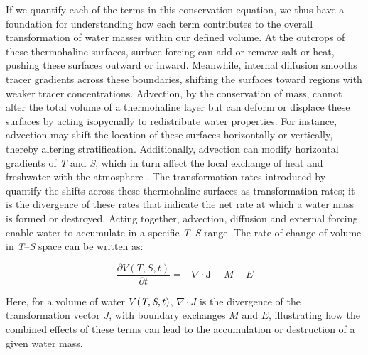\documentclass[draft]{agujournal2019}
\begin{document}
If we quantify each of the terms in this conservation equation, we thus have a foundation for understanding how each term contributes to the overall transformation of water masses within our defined volume. At the outcrops of these thermohaline surfaces, surface forcing can add or remove salt or heat, pushing these surfaces outward or inward. Meanwhile, internal diffusion smooths tracer gradients across these boundaries, shifting the surfaces toward regions with weaker tracer concentrations. Advection, by the conservation of mass, cannot alter the total volume of a thermohaline layer but can deform or displace these surfaces by acting isopycnally to redistribute water properties. For instance, advection may shift the location of these surfaces horizontally or vertically, thereby altering stratification. Additionally, advection can modify horizontal gradients of \emph{T} and \emph{S}, which in turn affect the local exchange of heat and freshwater with the atmosphere \cite{Maze2009}. The transformation rates introduced by  quantify the shifts across these thermohaline surfaces as transformation rates; it is the divergence of these rates that indicate the net rate at which a water mass is formed or destroyed. Acting together, advection, diffusion and external forcing enable water to accumulate in a specific \emph{T}--\emph{S} range. The rate of change of volume in \emph{T}--\emph{S} space can be written as:

\begin{equation}
    \frac{\partial V(T, S, t)}{\partial t} = - \nabla \cdot \mathbf{J} - M - E \label{eq:convergence}
\end{equation}

Here, for a volume of water $V(\emph{T},\emph{S},t)$, $\nabla \cdot J$ is the divergence of the transformation vector $J$, with boundary exchanges $M$ and $E$, illustrating how the combined effects of these terms can lead to the accumulation or destruction of a given water mass.
\end{document}
